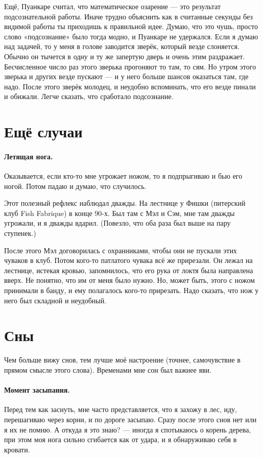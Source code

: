 \documentclass{book}
\begin{document}
Ещё, Пуанкаре считал, что математическое озарение --- это результат подсознательной работы.
Иначе трудно объяснить как в считанные секунды без видимой работы ты приходишь к правильной идее.
Думаю, что это чушь, просто слово «подсознание» было тогда модно, и Пуанкаре не удержался.
Если я думаю над задачей, то у меня в голове заводится зверёк, который везде слоняется.
Обычно он тычется в одну и ту же запертую дверь и очень этим раздражает.
Бесчисленное число раз этого зверька прогоняют то там, то сям.
Но утром этого зверька и других везде пускают --- и у него больше шансов оказаться там, где надо.
После этого зверёк молодец, и неудобно вспоминать, что его везде пинали и обижали.
Легче сказать, что сработало подсознание.


\section*{Ещё случаи}

\paragraph{Летящая нога.}
Оказывается, если кто-то мне угрожает ножом, то я подпрыгиваю и бью его ногой.
Потом падаю и думаю, что случилось.

Этот полезный рефлекс наблюдал дважды.
На лестнице у Фишки (питерский клуб Fish Fabrique) в конце 90-х.
Был там с Мэл и Сэм, мне там дважды угрожали, и я дважды вдарил.
(Повезло, что оба раза был выше на пару ступенек.)

После этого Мэл договорилась с охранниками, чтобы они не пускали этих чуваков в клуб.
Потом кого-то патлатого чувака всё же прирезали.
Он лежал на лестнице, истекая кровью, запомнилось, что его рука от локтя была направлена вверх. 
Не понятно, что им от меня было нужно.
Но, может быть, этого с ножом принимали в банду, и ему полагалось кого-то прирезать.
Надо сказать, что нож у него был складной и неудобный.

\section*{Сны}

Чем больше вижу снов, тем лучше моё настроение (точнее, самочувствие в прямом смысле этого слова).
Временами мне сон был важнее яви.

\paragraph{Момент засыпания.}
Перед тем как заснуть, мне часто представляется, что я захожу в лес, иду, перешагиваю через корни, и по дороге засыпаю.
Сразу после этого снов нет или я их не помню.
А откуда я это знаю? --- иногда я спотыкаюсь о корень дерева, при этом моя нога сильно сгибается как от удара, и я обнаруживаю себя в кровати.
\end{document}
